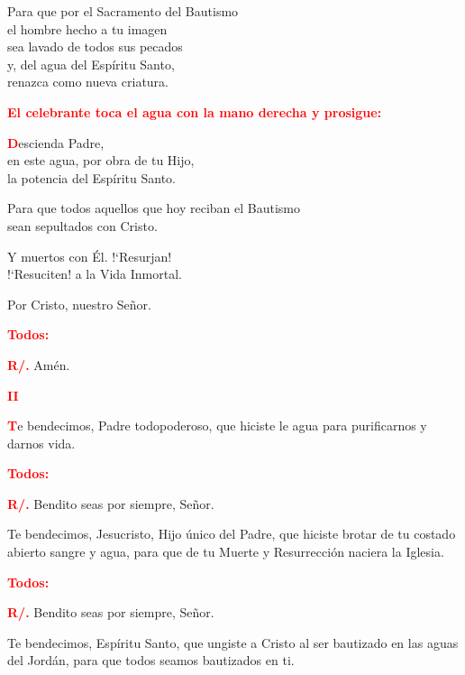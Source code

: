 \documentclass[12pt, letterpaper]{report}
\begin{document}
Para que por el Sacramento del Bautismo\\ el hombre hecho a tu imagen\\ sea lavado de todos sus pecados\\ y, del agua del Esp\'iritu Santo,\\ renazca como nueva criatura.

\large {\bfseries \textcolor{red}{El celebrante toca el agua con la mano derecha y prosigue:}}

\lettrine[lines=1]{\bfseries \textcolor{red}{D}}{}\Large escienda Padre,\\ en este agua, por obra de tu Hijo,\\ la potencia del Esp\'iritu Santo.

Para que todos aquellos que hoy reciban el Bautismo\\ sean sepultados con Cristo.

Y muertos con \'El. !`Resurjan!\\ !`Resuciten! a la Vida Inmortal.

Por Cristo, nuestro Se\~nor.

\large {\bfseries \textcolor{red}{Todos:}}

\noindent
\Large {\bfseries \textcolor{red}{R/.}} \hspace{0.5cm} Am\'en.

\newpage

\begin{center}
\Large {\bfseries \textcolor{red}{II}} 
\end{center}

\lettrine[lines=1]{\bfseries \textcolor{red}{T}}{}\Large e bendecimos, Padre todopoderoso, que hiciste le agua para purificarnos y darnos vida.

\large {\bfseries \textcolor{red}{Todos:}}

\noindent
\Large {\bfseries \textcolor{red}{R/.}} \hspace{0.5cm} Bendito seas por siempre, Se\~nor.

Te bendecimos, Jesucristo, Hijo \'unico del Padre, que hiciste brotar de tu costado abierto sangre y agua, para que de tu Muerte y Resurrecci\'on naciera la Iglesia.

\large {\bfseries \textcolor{red}{Todos:}}

\noindent
\Large {\bfseries \textcolor{red}{R/.}} \hspace{0.5cm} Bendito seas por siempre, Se\~nor.

Te bendecimos, Esp\'iritu Santo, que ungiste a Cristo al ser bautizado en las aguas del Jord\'an, para que todos seamos bautizados en ti.
\end{document}
